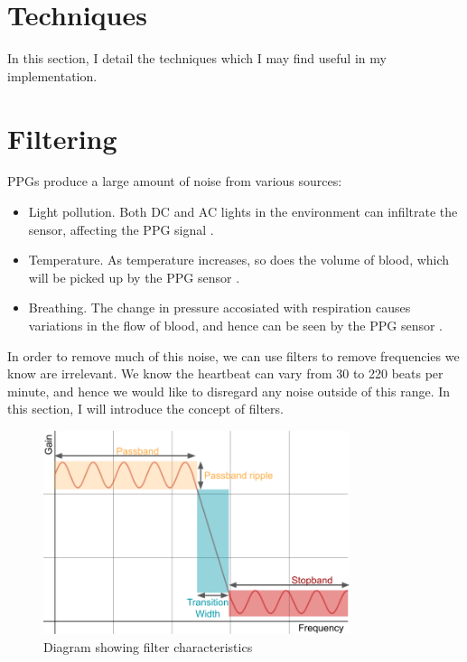 \documentclass[12pt,a4paper,twoside,openright]{report}
\begin{document}
\section{Techniques}

In this section, I detail the techniques which I may find useful in my
implementation.

\section{Filtering} \label{section:intro-filters}

PPGs produce a large amount of noise from various sources:
\begin{itemize}
	\item Light pollution. Both DC and AC lights in the environment can
		infiltrate the sensor, affecting the PPG signal \cite{kim15}.
	\item Temperature. As temperature increases, so does the volume of
		blood, which will be picked up by the PPG sensor 
		\cite{shin16}.
	\item Breathing. The change in pressure accosiated with respiration
		causes variations in the flow of blood, and hence can be seen
		by the PPG sensor \cite{allen02}.
\end{itemize}

In order to remove much of this noise, we can use filters to remove
frequencies we know are irrelevant. We know the heartbeat can vary from 
30 to 220 beats per minute, and hence we would like to disregard any noise 
outside of this range. In this section, I will introduce the concept of 
filters.

\begin{figure}[h!]
	\centerline{\includegraphics[width=0.8\textwidth]{figs/filter.png}}
\caption{Diagram showing filter characteristics}
\label{fig:filterdiag}
\end{figure}
\end{document}
